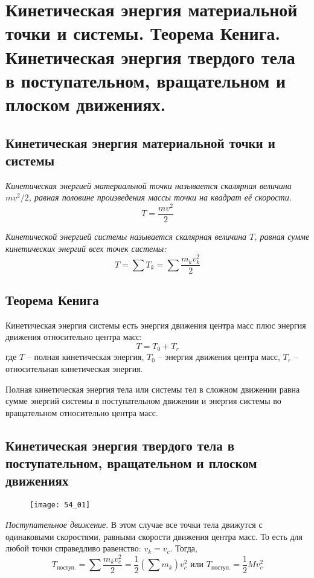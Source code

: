 \chapter{Кинетическая энергия материальной точки и системы. Теорема Кенига.
Кинетическая энергия твердого тела в поступательном, вращательном и плоском
движениях.}

\section{Кинетическая энергия материальной точки и системы}

\emph{Кинетическая энергией материальной точки называется 
скалярная величина \( mv^2/2 \), равная половине произведения 
массы точки на квадрат её скорости.}
\[ T = \frac{mv^2}{2} \]

\emph{Кинетической энергией системы называется скалярная величина 
\( T \), равная сумме кинетических энергий всех точек системы:}
\[ T = \sum T_k = \sum\frac{m_k v^2_k}{2} \]

\section{Теорема Кенига}
Кинетическая энергия системы есть энергия движения центра масс плюс энергия 
движения относительно центра масс:
\[ T = T_0 + T_r \]
где \( T \) -- полная кинетическая энергия, \( T_0 \) -- энергия движения 
центра масс, \( T_r \) -- относительная кинетическая энергия.

Полная кинетическая энергия тела или системы тел в сложном движении равна 
сумме энергий системы в поступательном движении и энергия системы во 
вращательном относительно центра масс.

\section{Кинетическая энергия твердого тела в поступательном, вращательном 
и плоском движениях}

\begin{figure}[h!]
    \texttt{[image: 54\_01]}
    \parbox{.47\textwidth}{\caption{} \label{pic54_01}}
\end{figure}

\emph{Поступательное движение}. В этом случае все точки тела движутся 
с одинаковыми скоростями, равными скорости движения центра масс. То есть 
для любой точки справедливо равенство: \( v_k = v_c \). Тогда, 
\[ 
	T_{\text{поступ.}} = \sum\frac{m_k v^2_c}{2} = 
	\frac{1}{2}\left( \sum m_k \right)v^2_c
	\text{ или }
	T_{\text{поступ.}} = \frac{1}{2}Mv^2_c
\]

